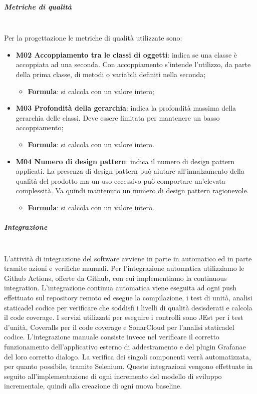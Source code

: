 \subparagraph{Metriche di qualità} \mbox{} \\
Per la progettazione le metriche di qualità utilizzate sono:
\begin{itemize}
	\item \textbf{M02 Accoppiamento tra le classi di oggetti}: indica se una classe è accoppiata ad una seconda. Con accoppiamento s'intende l'utilizzo, da parte della prima classe, di metodi o variabili definiti nella seconda; 
	\begin{itemize}
		\item[] \textbf{Formula}: si calcola con un valore intero;
	\end{itemize}
	\item \textbf{M03 Profondità della gerarchia}: indica la profondità massima della gerarchia delle classi. Deve essere limitata per mantenere un basso accoppiamento;
	\begin{itemize}
		\item[] \textbf{Formula}: si calcola con un valore intero.
	\end{itemize} 	
	\item \textbf{M04 Numero di design pattern}: indica il numero di design pattern applicati. La presenza di design pattern può aiutare all'innalzamento della qualità del prodotto ma un uso eccessivo può comportare un'elevata complessità. Va quindi mantenuto un numero di design pattern ragionevole.
	\begin{itemize}
		\item[] \textbf{Formula}: si calcola con un valore intero.
	\end{itemize} 	
\end{itemize}

\subparagraph{Integrazione} \mbox{} \\
L'attività di integrazione del software avviene in parte in automatico ed in parte tramite azioni e verifiche manuali.
\newline
Per l'integrazione automatica utilizziamo le Github Actions, offerte da Github, con cui implementiamo la continuous integration. L'integrazione continua automatica viene eseguita ad ogni push effettuato sul repository remoto ed esegue la compilazione, i test di unità, analisi statica\glosp del codice per verificare che soddisfi i livelli di qualità desisderati e calcola il code coverage. I servizi utilizzati per eseguire i controlli sono JEst per i test d'unità, Coveralls per il code coverage e SonarCloud per l'analisi statica\glosp del codice.
\newline
L'integrazione manuale consiste invece nel verificare il corretto funzionamento dell'applicativo esterno di addestramento e del plugin Grafana\glosp e del loro corretto dialogo. La verifica dei singoli componenti verrà automatizzata, per quanto possibile, tramite Selenium\glo. Queste integrazioni vengono effettuate in seguito all'implementazione di ogni incremento del modello di sviluppo incrementale, quindi alla creazione di ogni nuova baseline\glo.

